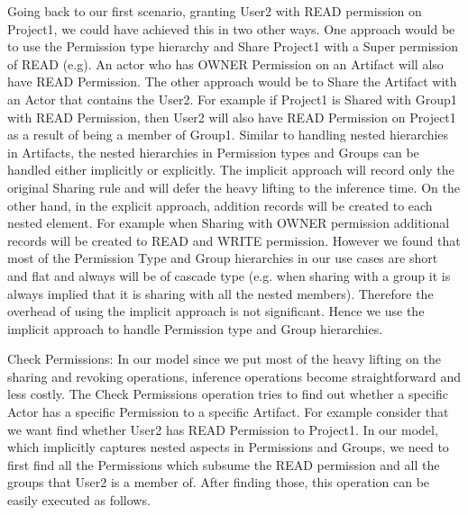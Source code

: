 \documentclass[sigconf]{acmart}
\begin{document}
Going back to our first scenario, granting User2 with READ permission on Project1, we could have achieved this in two other ways. One approach would be to use the Permission type hierarchy and Share Project1 with a Super permission of READ (e.g). An actor who has OWNER Permission on an Artifact will also have READ Permission. The other approach would be to Share the Artifact with an Actor that contains the User2. For example if Project1 is Shared with Group1 with READ Permission, then User2 will also have READ Permission on Project1 as a result of being a member of Group1. Similar to handling nested hierarchies in Artifacts, the nested hierarchies in Permission types and Groups can be handled either implicitly or explicitly. The implicit approach will record only the original Sharing  rule and will defer the heavy lifting to the inference time. On the other hand, in the explicit approach, addition records will be created to each nested element. For example when Sharing with OWNER permission additional records will be created to READ and WRITE permission. However we found that most of the Permission Type and Group hierarchies in our use cases are short and flat and always will be of cascade type (e.g. when sharing with a group it is always implied that it is sharing with all the nested members). Therefore the overhead of using the implicit approach is not significant. Hence we use the implicit approach to handle Permission type and Group hierarchies.

Check Permissions: In our model since we put most of the heavy lifting on the sharing and revoking operations, inference operations become straightforward and less costly. The Check Permissions operation tries to find out whether a specific Actor has a specific Permission to a specific Artifact. For example consider that we want find whether User2 has READ Permission to Project1. In our model, which implicitly captures nested aspects in Permissions and Groups, we need to first find all the Permissions which subsume the READ permission and all the groups that User2 is a member of. After finding those, this operation can be easily executed as follows.
\end{document}
